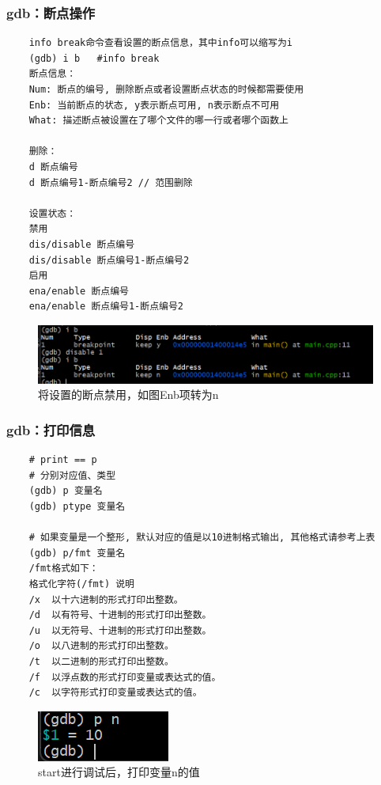 \documentclass[UTF8]{ctexart}
\begin{document}
\subsubsection{gdb：断点操作}
\begin{verbatim}
	info break命令查看设置的断点信息，其中info可以缩写为i
	(gdb) i b   #info break
	断点信息：
	Num: 断点的编号, 删除断点或者设置断点状态的时候都需要使用
	Enb: 当前断点的状态, y表示断点可用, n表示断点不可用
	What: 描述断点被设置在了哪个文件的哪一行或者哪个函数上

	删除：
	d 断点编号
	d 断点编号1-断点编号2 // 范围删除

	设置状态：
	禁用
	dis/disable 断点编号
	dis/disable 断点编号1-断点编号2
	启用
	ena/enable 断点编号
	ena/enable 断点编号1-断点编号2
\end{verbatim}
\begin{figure}[H]
	\centering
	\includegraphics[width=0.7\linewidth]{figure/gdb_dis_b.png}
	\caption{将设置的断点禁用，如图Enb项转为n}	
\end{figure}


\subsubsection{gdb：打印信息}
\begin{verbatim}
	# print == p
	# 分别对应值、类型
	(gdb) p 变量名
	(gdb) ptype 变量名

	# 如果变量是一个整形, 默认对应的值是以10进制格式输出, 其他格式请参考上表
	(gdb) p/fmt 变量名
	/fmt格式如下：
	格式化字符(/fmt)	说明
	/x	以十六进制的形式打印出整数。
	/d	以有符号、十进制的形式打印出整数。
	/u	以无符号、十进制的形式打印出整数。
	/o	以八进制的形式打印出整数。
	/t	以二进制的形式打印出整数。
	/f	以浮点数的形式打印变量或表达式的值。
	/c	以字符形式打印变量或表达式的值。
\end{verbatim}
\begin{figure}[H]
	\centering
	\includegraphics[width=0.7\linewidth]{figure/pn.png}
	\caption{start进行调试后，打印变量n的值}	
\end{figure}
\end{document}
